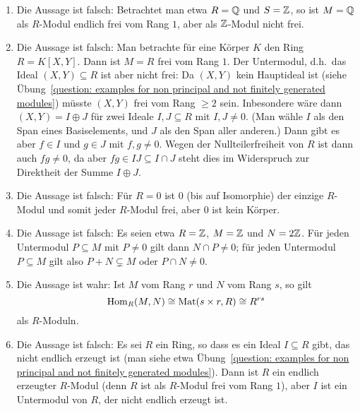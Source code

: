 \begin{solution}
\begin{enumerate}
    \item
      Die Aussage ist falsch:
      Betrachtet man etwa $R = \mathbb{Q}$ und $S = \mathbb{Z}$, so ist $M = \mathbb{Q}$ als $R$-Modul endlich frei vom Rang $1$, aber als $\mathbb{Z}$-Modul nicht frei.
      
    \item
      Die Aussage ist falsch:
      Man betrachte für eine Körper $K$ den Ring $R = K[X,Y]$.
      Dann ist $M = R$ frei vom Rang $1$.
      Der Untermodul, d.h.\ das Ideal $(X,Y) \subseteq R$ ist aber nicht frei:
      Da $(X,Y)$ kein Hauptideal ist (siehe Übung~\ref{question: examples for non principal and not finitely generated modules}) müsste $(X,Y)$ frei vom Rang $\geq 2$ sein.
      Inbesondere wäre dann $(X,Y) = I \oplus J$ für zwei Ideale $I, J \subseteq R$ mit $I, J \neq 0$.
      (Man wähle $I$ als den Span eines Basiselements, und $J$ als den Span aller anderen.)
      Dann gibt es aber $f \in I$ und $g \in J$ mit $f, g \neq 0$.
      Wegen der Nullteilerfreiheit von $R$ ist dann auch $fg \neq 0$, da aber $fg \in IJ \subseteq I \cap J$ steht dies im Widerspruch zur Direktheit der Summe $I \oplus J$.
      
    \item
      Die Aussage ist falsch:
      Für $R = 0$ ist $0$ (bis auf Isomorphie) der einzige $R$-Modul und somit jeder $R$-Modul frei, aber $0$ ist kein Körper.
      
    \item
      Die Aussage ist falsch:
      Es seien etwa $R = \mathbb{Z}$, $M = \mathbb{Z}$ und $N = 2\mathbb{Z}$.
      Für jeden Untermodul $P \subseteq M$ mit $P \neq 0$ gilt dann $N \cap P \neq 0$;
      für jeden Untermodul $P \subseteq M$ gilt also $P + N \subsetneq M$ oder $P \cap N \neq 0$.
      
    \item
      Die Aussage ist wahr:
      Ist $M$ vom Rang $r$ und $N$ vom Rang $s$, so gilt
      \[
              \operatorname{Hom}_R(M,N)
        \cong \operatorname{Mat}(s \times r, R)
        \cong R^{rs}
      \]
      als $R$-Moduln.
      
    \item
      Die Aussage ist falsch:
      Es sei $R$ ein Ring, so dass es ein Ideal $I \subseteq R$ gibt, das nicht endlich erzeugt ist (man siehe etwa Übung~\ref{question: examples for non principal and not finitely generated modules}).
      Dann ist $R$ ein endlich erzeugter $R$-Modul (denn $R$ ist als $R$-Modul frei vom Rang $1$), aber $I$ ist ein Untermodul von $R$, der nicht endlich erzeugt ist.
      

\end{enumerate}
\end{solution}
